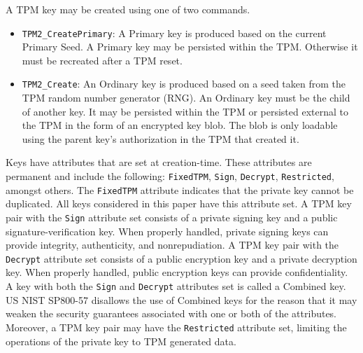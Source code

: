 A TPM key may be created using one of two commands.
\begin{itemize}
  \item \texttt{TPM2\_CreatePrimary}: A Primary key is produced based on the current Primary Seed. A Primary key may be persisted within the TPM. Otherwise it must be recreated after a TPM reset.
  \item \texttt{TPM2\_Create}: An Ordinary key is produced based on a seed taken from the TPM random number generator (RNG). An Ordinary key must be the child of another key. It may be persisted within the TPM or persisted external to the TPM in the form of an encrypted key blob. The blob is only loadable using the parent key's authorization in the TPM that created it.
\end{itemize}

Keys have attributes that are set at creation-time. These attributes are permanent and include the following: \texttt{FixedTPM}, \texttt{Sign}, \texttt{Decrypt}, \texttt{Restricted}, amongst others. The \texttt{FixedTPM} attribute indicates that the private key cannot be duplicated. All keys considered in this paper have this attribute set. A TPM key pair with the \texttt{Sign} attribute set consists of a private signing key and a public signature-verification key. When properly handled, private signing keys can provide integrity, authenticity, and nonrepudiation. A TPM key pair with the \texttt{Decrypt} attribute set consists of a public encryption key and a private decryption key. When properly handled, public encryption keys can provide confidentiality. A key with both the \texttt{Sign} and \texttt{Decrypt} attributes set is called a Combined key. US NIST SP800-57 disallows the use of Combined keys for the reason that it may weaken the security guarantees associated with one or both of the attributes. Moreover, a TPM key pair may have the \texttt{Restricted} attribute set, limiting the operations of the private key to TPM generated data.


